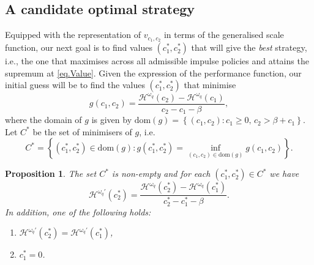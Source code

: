 \documentclass[11pt,reqno]{amsart}
\newtheorem{proposition}{Proposition}[section]
\newcommand{\cH}{\mathcal{H}}
\newcommand{\homega}{\omega_q}
\newcommand{\BRA}[1]{{{\left\{#1\right\}}}} %
\renewcommand{\geq}{\geqslant}
\begin{document}
\subsection{A candidate optimal strategy}
Equipped with the representation of $v_{c_1,c_2}$ in terms of the generalised scale function, our next goal is to find values $(c^\ast_1,c^\ast_2)$ that will give the \textit{best} strategy, i.e., the one that maximises across all admissible impulse policies and attains the supremum at \eqref{eq.Value}. Given the expression of the performance function, our initial guess will be to find the values $(c^\ast_1,c^\ast_2)$ that minimise
\[
g(c_1,c_2) = \frac{\cH^{\homega}(c_2) - \cH^{\homega}(c_1)}{c_2-c_1-\beta},
\]
where the domain of $g$ is given by $\text{dom}(g) = \BRA{(c_1,c_2): c_1 \geq 0, \, c_2 > \beta + c_1}$.\\
Let $C^\ast$ be the set of minimisers of $g$, i.e.
\[
C^\ast = \BRA{(c_1^\ast, c_2^\ast) \in \text{dom}(g): g(c_1^\ast, c_2^\ast) = \inf_{(c_1,c_2)\in \text{dom}(g)}g(c_1,c_2)}.
\]
\begin{proposition}
	The set $C^\ast$ is non-empty and for each $(c_1^\ast, c_2^\ast) \in C^\ast$ we have
	\[
	\cH^{\homega\prime}(c_2^\ast) = \frac{\cH^{\homega}(c_2^\ast) - \cH^{\homega}(c_1^\ast)}{c_2^\ast-c_1^\ast-\beta}.
	\]
	In addition, one of the following holds:
	\begin{enumerate}
		\item $\cH^{\homega\prime}(c_2^\ast) = \cH^{\homega\prime}(c_1^\ast)$,
		\item $c_1^\ast = 0$.
	\end{enumerate}
\end{proposition}
\end{document}
